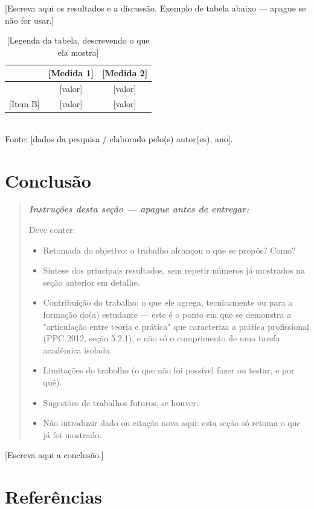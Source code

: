 \documentclass[article,12pt,a4paper,oneside]{abntex2}
\newenvironment{instrucoes}{%
  \begin{quotation}\footnotesize\itshape
  \noindent\textbf{\upshape Instruções desta seção — apague antes de entregar:}\par\smallskip
}{%
  \end{quotation}
}
\begin{document}
[Escreva aqui os resultados e a discussão. Exemplo de tabela abaixo — apague se não for usar.]

\begin{table}[!ht]
  \centering
  \caption{[Legenda da tabela, descrevendo o que ela mostra]}
  \begin{tabular}{lcc}
    \hline
    [Categoria] & [Medida 1] & [Medida 2] \\
    \hline
    [Item A] & [valor] & [valor] \\{}
    [Item B] & [valor] & [valor] \\
    \hline
  \end{tabular}
  \\[0.3em]
  {\footnotesize Fonte: [dados da pesquisa / elaborado pelo(s) autor(es), ano].}
\end{table}

\section{Conclusão}

\begin{instrucoes}
Deve conter:
\begin{itemize}
  \item Retomada do objetivo: o trabalho alcançou o que se propôs? Como?
  \item Síntese dos principais resultados, sem repetir números já mostrados na seção anterior em detalhe.
  \item Contribuição do trabalho: o que ele agrega, tecnicamente ou para a formação do(a) estudante — este é o ponto em que se demonstra a "articulação entre teoria e prática" que caracteriza a prática profissional (PPC 2012, seção 5.2.1), e não só o cumprimento de uma tarefa acadêmica isolada.
  \item Limitações do trabalho (o que não foi possível fazer ou testar, e por quê).
  \item Sugestões de trabalhos futuros, se houver.
  \item Não introduzir dado ou citação nova aqui: esta seção só retoma o que já foi mostrado.
\end{itemize}
\end{instrucoes}

[Escreva aqui a conclusão.]

\postextual

\section*{Referências}
\end{document}
